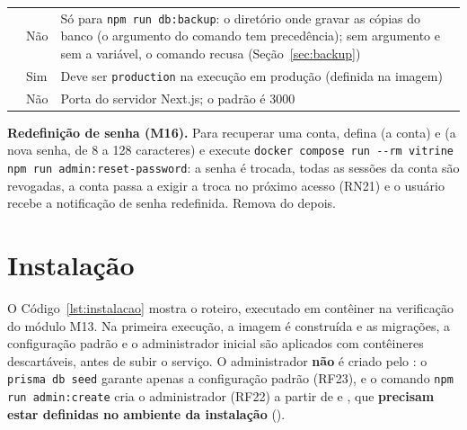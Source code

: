 \begin{table}[htb]
\begin{tabularx}{\linewidth}{@{}L{4.1cm}L{2.2cm}Y@{}}
\addlinespace
{} & Não & Só para \texttt{npm run db:backup}: o diretório onde gravar as cópias do banco (o argumento do comando tem precedência); sem argumento e sem a variável, o comando recusa (Seção~\ref{sec:backup})\\
\addlinespace
{} & Sim & Deve ser \texttt{production} na execução em produção (definida na imagem)\\
\addlinespace
{} & Não & Porta do servidor Next.js; o padrão é 3000\\
\bottomrule
\end{tabularx}
\end{table}

\textbf{Redefinição de senha (M16).} Para recuperar uma conta, defina  (a conta) e  (a nova senha, de 8 a 128 caracteres) e execute \texttt{docker compose run -{}-rm vitrine npm run admin:reset-password}: a senha é trocada, todas as sessões da conta são revogadas, a conta passa a exigir a troca no próximo acesso (RN21) e o usuário recebe a notificação de senha redefinida. Remova  do  depois.

\section{Instalação}

O Código~\ref{lst:instalacao} mostra o roteiro, executado em contêiner na verificação do módulo M13. Na primeira execução, a imagem é construída e as migrações, a configuração padrão e o administrador inicial são aplicados com contêineres descartáveis, antes de subir o serviço. O administrador \textbf{não} é criado pelo : o \texttt{prisma db seed} garante apenas a configuração padrão (RF23), e o comando \texttt{npm run admin:create} cria o administrador (RF22) a partir de  e , que \textbf{precisam estar definidas no ambiente da instalação} ().

